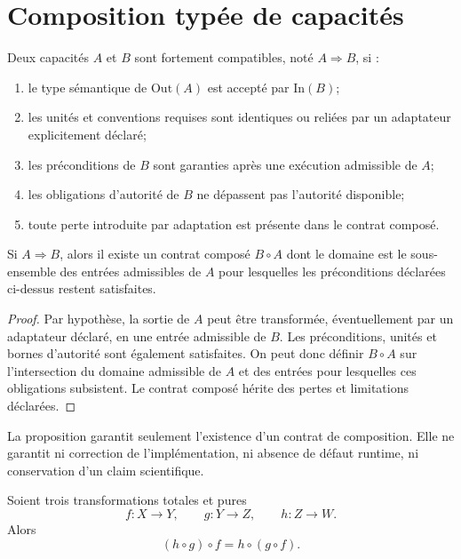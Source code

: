 \section{Composition typée de capacités}

\begin{definition}
Deux capacités $A$ et $B$ sont fortement compatibles, noté $A\Rightarrow B$, si :
\begin{enumerate}
  \item le type sémantique de $\mathrm{Out}(A)$ est accepté par $\mathrm{In}(B)$;
  \item les unités et conventions requises sont identiques ou reliées par un adaptateur explicitement déclaré;
  \item les préconditions de $B$ sont garanties après une exécution admissible de $A$;
  \item les obligations d'autorité de $B$ ne dépassent pas l'autorité disponible;
  \item toute perte introduite par adaptation est présente dans le contrat composé.
\end{enumerate}
\end{definition}

\begin{proposition}
Si $A\Rightarrow B$, alors il existe un contrat composé $B\circ A$ dont le domaine est le sous-ensemble des entrées admissibles de $A$ pour lesquelles les préconditions déclarées ci-dessus restent satisfaites.
\end{proposition}

\begin{proof}
Par hypothèse, la sortie de $A$ peut être transformée, éventuellement par un adaptateur déclaré, en une entrée admissible de $B$. Les préconditions, unités et bornes d'autorité sont également satisfaites. On peut donc définir $B\circ A$ sur l'intersection du domaine admissible de $A$ et des entrées pour lesquelles ces obligations subsistent. Le contrat composé hérite des pertes et limitations déclarées.
\end{proof}

\begin{observation}
La proposition garantit seulement l'existence d'un contrat de composition. Elle ne garantit ni correction de l'implémentation, ni absence de défaut runtime, ni conservation d'un claim scientifique.
\end{observation}

\begin{proposition}
Soient trois transformations totales et pures
\[
f:X\to Y,\qquad g:Y\to Z,\qquad h:Z\to W.
\]
Alors
\[
(h\circ g)\circ f=h\circ(g\circ f).
\]
\end{proposition}

